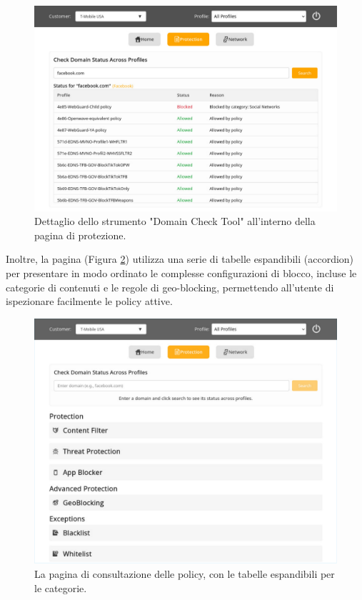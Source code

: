 \documentclass[12pt,a4paper,openright,twoside]{book}
\begin{document}
\begin{figure}[htbp]
    \centering
    \includegraphics[width=\textwidth]{figures/PROTECTION_DOMAIN.pdf}
    \caption{Dettaglio dello strumento "Domain Check Tool" all'interno della pagina di protezione.}
    \label{fig:protection_domain_check}
\end{figure}

\FloatBarrier

Inoltre, la pagina (Figura \ref{fig:protection_policies}) utilizza una serie di tabelle espandibili (accordion) per presentare in modo ordinato le complesse configurazioni di blocco, incluse le categorie di contenuti e le regole di geo-blocking, permettendo all'utente di ispezionare facilmente le policy attive.

\begin{figure}[htbp]
    \centering
    \includegraphics[width=\textwidth]{figures/PROTECTION.pdf}
    \caption{La pagina di consultazione delle policy, con le tabelle espandibili per le categorie.}
    \label{fig:protection_policies}
\end{figure}
\end{document}
